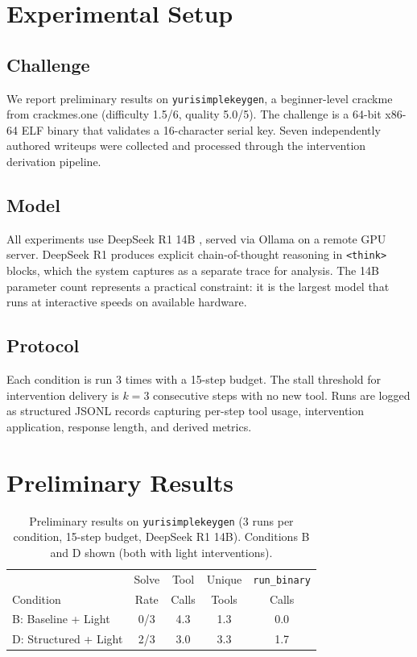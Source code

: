 \documentclass[letterpaper]{article}
\begin{document}
\section{Experimental Setup}

\subsection{Challenge}

We report preliminary results on \texttt{yurisimplekeygen}, a beginner-level crackme from crackmes.one (difficulty 1.5/6, quality 5.0/5).
The challenge is a 64-bit x86-64 ELF binary that validates a 16-character serial key.
Seven independently authored writeups were collected and processed through the intervention derivation pipeline.

\subsection{Model}

All experiments use DeepSeek R1 14B \citep{deepseekai2025deepseekr1}, served via Ollama on a remote GPU server.
DeepSeek R1 produces explicit chain-of-thought reasoning in \texttt{<think>} blocks, which the system captures as a separate trace for analysis.
The 14B parameter count represents a practical constraint: it is the largest model that runs at interactive speeds on available hardware.

\subsection{Protocol}

Each condition is run 3 times with a 15-step budget.
The stall threshold for intervention delivery is $k=3$ consecutive steps with no new tool.
Runs are logged as structured JSONL records capturing per-step tool usage, intervention application, response length, and derived metrics.

\section{Preliminary Results}

\begin{table}[t]
\centering
\caption{Preliminary results on \texttt{yurisimplekeygen} (3 runs per condition, 15-step budget, DeepSeek R1 14B). Conditions B and D shown (both with light interventions).}
\label{tab:results}
\begin{tabular}{lcccc}
\toprule
 & Solve & Tool & Unique & \texttt{run\_binary} \\
Condition & Rate & Calls & Tools & Calls \\
\midrule
B: Baseline + Light & 0/3 & 4.3 & 1.3 & 0.0 \\
D: Structured + Light & 2/3 & 3.0 & 3.3 & 1.7 \\
\bottomrule
\end{tabular}
\end{table}
\end{document}
